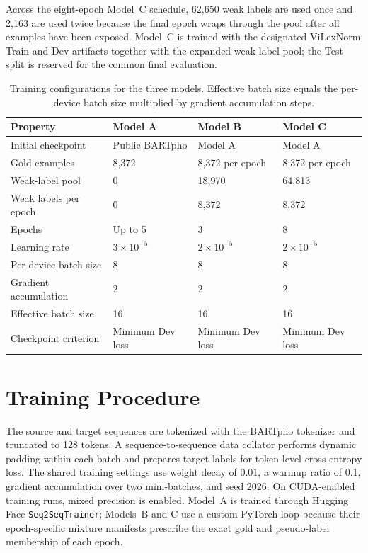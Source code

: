 \documentclass[11pt]{article}
\begin{document}
Across the eight-epoch Model~C schedule, 62,650 weak labels are used once and 2,163 are used twice because the final epoch wraps through the pool after all examples have been exposed. Model~C is trained with the designated ViLexNorm Train and Dev artifacts together with the expanded weak-label pool; the Test split is reserved for the common final evaluation.

\begin{table}[t]
\centering
\caption{Training configurations for the three models. Effective batch size equals the per-device batch size multiplied by gradient accumulation steps.}
\label{tab:training-configurations}
\begin{tabularx}{\linewidth}{lXXX}
\toprule
Property & Model A & Model B & Model C \\
\midrule
Initial checkpoint & Public BARTpho & Model A & Model A \\
Gold examples & 8,372 & 8,372 per epoch & 8,372 per epoch \\
Weak-label pool & 0 & 18,970 & 64,813 \\
Weak labels per epoch & 0 & 8,372 & 8,372 \\
Epochs & Up to 5 & 3 & 8 \\
Learning rate & $3\times10^{-5}$ & $2\times10^{-5}$ & $2\times10^{-5}$ \\
Per-device batch size & 8 & 8 & 8 \\
Gradient accumulation & 2 & 2 & 2 \\
Effective batch size & 16 & 16 & 16 \\
Checkpoint criterion & Minimum Dev loss & Minimum Dev loss & Minimum Dev loss \\
\bottomrule
\end{tabularx}
\end{table}

\section{Training Procedure}

The source and target sequences are tokenized with the BARTpho tokenizer and truncated to 128 tokens. A sequence-to-sequence data collator performs dynamic padding within each batch and prepares target labels for token-level cross-entropy loss. The shared training settings use weight decay of 0.01, a warmup ratio of 0.1, gradient accumulation over two mini-batches, and seed 2026. On CUDA-enabled training runs, mixed precision is enabled. Model~A is trained through Hugging Face \texttt{Seq2SeqTrainer}; Models~B and C use a custom PyTorch loop because their epoch-specific mixture manifests prescribe the exact gold and pseudo-label membership of each epoch.
\end{document}
